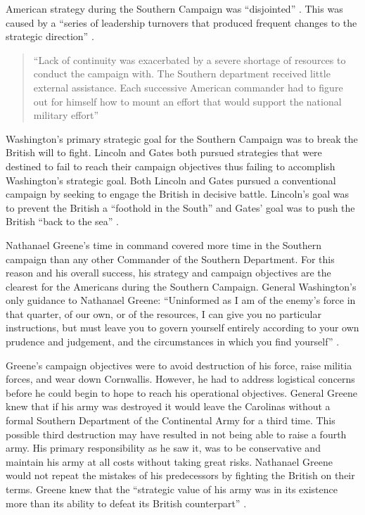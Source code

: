 American strategy during the Southern Campaign was “disjointed”
\cite[p.60]{woodward_comparative_2002}. This was caused by a “series of leadership turnovers that
produced frequent changes to the strategic direction”
\cite[61]{woodward_comparative_2002}.  

\begin{quote} “Lack of continuity was exacerbated by a severe shortage of
  resources to conduct the campaign with.  The Southern department received
  little external assistance.  Each successive American commander had to figure
  out for himself how to mount an effort that would support the national
  military effort” \cite[p.61]{woodward_comparative_2002} \end{quote}

Washington's primary strategic goal for the Southern Campaign was to break the
British will to fight.  Lincoln and Gates both pursued strategies that were
destined to fail to reach their campaign objectives thus failing to accomplish
Washington’s strategic goal.  Both Lincoln and Gates pursued a conventional
campaign by seeking to engage the British in decisive battle.  Lincoln’s goal
was to prevent the British a “foothold in the South” and Gates’ goal was to push
the British “back to the sea” \cite[p.64]{woodward_comparative_2002}. 

Nathanael Greene’s time in command covered more time in the Southern campaign
than any other Commander of the Southern Department.  For this reason and his
overall success, his strategy and campaign objectives are the clearest for the
Americans during the Southern Campaign.  General Washington’s only guidance to
Nathanael Greene:  “Uninformed as I am of the enemy’s force in that quarter, of
our own, or of the resources, I can give you no particular instructions, but
must leave you to govern yourself entirely according to your own prudence and
judgement, and the circumstances in which you find yourself”
\cite[p.63]{woodward_comparative_2002}.

Greene’s campaign objectives were to avoid destruction of his force, raise
militia forces, and wear down Cornwallis.  However, he had to address logistical
concerns before he could begin to hope to reach his operational objectives.
General Greene knew that if his army was destroyed it would leave the Carolinas
without a formal Southern Department of the Continental Army for a third time.
This possible third destruction may have resulted in not being able to raise a
fourth army.  His primary responsibility as he saw it, was to be conservative
and maintain his army at all costs without taking great risks. Nathanael Greene
would not repeat the mistakes of his predecessors by fighting the British on
their terms.   Greene knew that the “strategic value of his army was in its
existence more than its ability to defeat its British counterpart”
\cite[p.66]{woodward_comparative_2002}.

